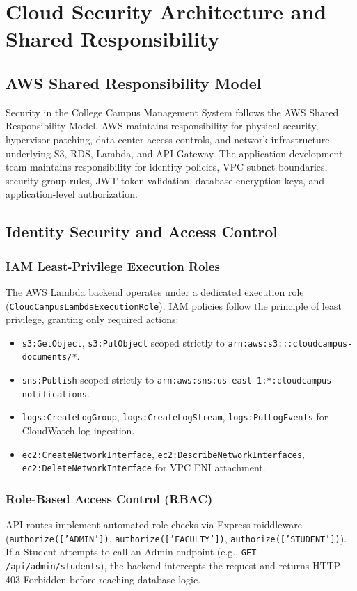 \chapter{Cloud Security Architecture and Shared Responsibility}
\label{chap:security}

\section{AWS Shared Responsibility Model}
Security in the College Campus Management System follows the AWS Shared Responsibility Model. AWS maintains responsibility for physical security, hypervisor patching, data center access controls, and network infrastructure underlying S3, RDS, Lambda, and API Gateway. The application development team maintains responsibility for identity policies, VPC subnet boundaries, security group rules, JWT token validation, database encryption keys, and application-level authorization.

\section{Identity Security and Access Control}
\subsection{IAM Least-Privilege Execution Roles}
The AWS Lambda backend operates under a dedicated execution role (\texttt{CloudCampusLambdaExecutionRole}). IAM policies follow the principle of least privilege, granting only required actions:
\begin{itemize}
    \item \texttt{s3:GetObject}, \texttt{s3:PutObject} scoped strictly to \texttt{arn:aws:s3:::cloudcampus-documents/*}.
    \item \texttt{sns:Publish} scoped strictly to \texttt{arn:aws:sns:us-east-1:*:cloudcampus-notifications}.
    \item \texttt{logs:CreateLogGroup}, \texttt{logs:CreateLogStream}, \texttt{logs:PutLogEvents} for CloudWatch log ingestion.
    \item \texttt{ec2:CreateNetworkInterface}, \texttt{ec2:DescribeNetworkInterfaces}, \texttt{ec2:DeleteNetworkInterface} for VPC ENI attachment.
\end{itemize}

\subsection{Role-Based Access Control (RBAC)}
API routes implement automated role checks via Express middleware (\texttt{authorize(['ADMIN'])}, \texttt{authorize(['FACULTY'])}, \texttt{authorize(['STUDENT'])}). If a Student attempts to call an Admin endpoint (e.g., \texttt{GET /api/admin/students}), the backend intercepts the request and returns HTTP 403 Forbidden before reaching database logic.

